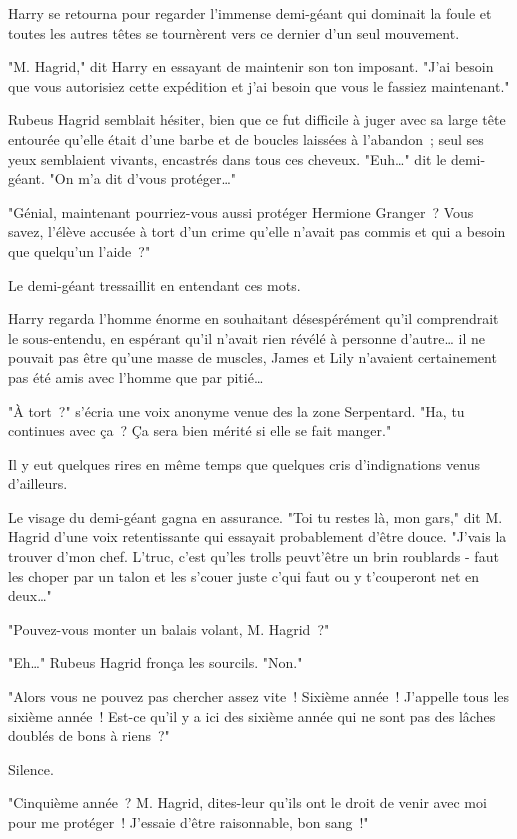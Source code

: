 Harry se retourna pour regarder l'immense demi-géant qui dominait la foule et toutes les autres têtes se tournèrent vers ce dernier d'un seul mouvement.

"M. Hagrid," dit Harry en essayant de maintenir son ton imposant. "J'ai besoin que vous autorisiez cette expédition et j'ai besoin que vous le fassiez maintenant."

Rubeus Hagrid semblait hésiter, bien que ce fut difficile à juger avec sa large tête entourée qu'elle était d'une barbe et de boucles laissées à l'abandon~; seul ses yeux semblaient vivants, encastrés dans tous ces cheveux. "Euh…" dit le demi-géant. "On m'a dit d'vous protéger…"

"Génial, maintenant pourriez-vous aussi protéger Hermione Granger~? Vous savez, l'élève accusée à tort d'un crime qu'elle n'avait pas commis et qui a besoin que quelqu'un l'aide~?"

Le demi-géant tressaillit en entendant ces mots.

Harry regarda l'homme énorme en souhaitant désespérément qu'il comprendrait le sous-entendu, en espérant qu'il n'avait rien révélé à personne d'autre… il ne pouvait pas être qu'une masse de muscles, James et Lily n'avaient certainement pas été amis avec l'homme que par pitié…

"À tort~?" s'écria une voix anonyme venue des la zone Serpentard. "Ha, tu continues avec ça~? Ça sera bien mérité si elle se fait manger."

Il y eut quelques rires en même temps que quelques cris d'indignations venus d'ailleurs.

Le visage du demi-géant gagna en assurance. "Toi tu restes là, mon gars," dit M. Hagrid d'une voix retentissante qui essayait probablement d'être douce. "J'vais la trouver d'mon chef. L'truc, c'est qu'les trolls peuvt'être un brin roublards - faut les choper par un talon et les s'couer juste c'qui faut ou y t'couperont net en deux…"

"Pouvez-vous monter un balais volant, M. Hagrid~?"

"Eh…" Rubeus Hagrid fronça les sourcils. "Non."

"Alors vous ne pouvez pas chercher assez vite~! Sixième année~! J'appelle tous les sixième année~! Est-ce qu'il y a ici des sixième année qui ne sont pas des lâches doublés de bons à riens~?"

Silence.

"Cinquième année~? M. Hagrid, dites-leur qu'ils ont le droit de venir avec moi pour me protéger~! J'essaie d'être raisonnable, bon sang~!"

